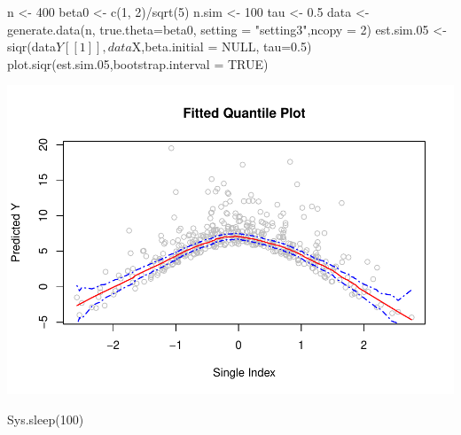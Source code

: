 \begin{Schunk}
\begin{Sinput}
n <- 400
beta0 <- c(1, 2)/sqrt(5)
n.sim <- 100
tau <- 0.5
data <- generate.data(n, true.theta=beta0, setting = "setting3",ncopy = 2)
est.sim.05 <- siqr(data$Y[[1]],data$X,beta.initial = NULL, tau=0.5)
plot.siqr(est.sim.05,bootstrap.interval = TRUE)
\end{Sinput}

\includegraphics{siqr_files/figure-latex/unnamed-chunk-15-1} \end{Schunk}

\begin{Schunk}
\begin{Sinput}
Sys.sleep(100)
\end{Sinput}
\end{Schunk}




\address{%
Author One\\
Affiliation\\%
line 1\\ line 2\\
%
%
%
\href{mailto:author1@work}{\nolinkurl{author1@work}}%
}

\address{%
Author Two\\
Affiliation\\%
line 1\\ line 2\\
%
%
%
\href{mailto:author2@work}{\nolinkurl{author2@work}}%
}
